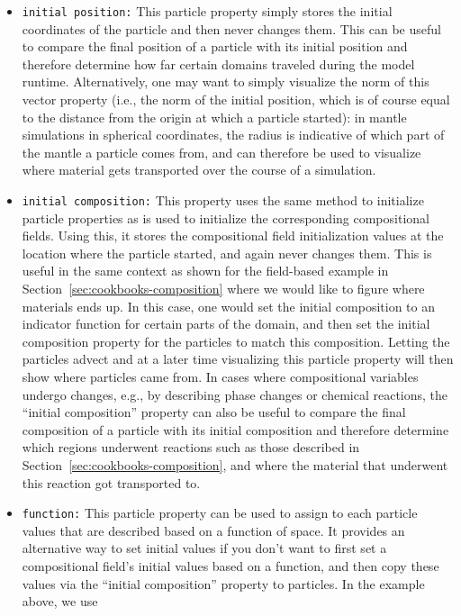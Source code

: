 \documentclass{article}
\begin{document}
\begin{itemize}
\item \texttt{initial position:} This particle property simply stores
  the initial coordinates of the particle and then never changes them. This
  can be useful to compare the final position of a particle with its 
  initial position and therefore determine how far certain domains traveled 
  during the model runtime. Alternatively, one may want to simply visualize
  the norm of this vector property (i.e., the norm of the initial position,
  which is of course equal to the distance from the origin at which a particle
  started): in mantle simulations in spherical coordinates, the radius is
  indicative of which part of the mantle a particle comes from, and can
  therefore be used to visualize where material gets transported over the course
  of a simulation.
\item \texttt{initial composition:} This property uses the same
  method to initialize particle properties as is used to initialize
  the corresponding compositional fields. Using this, it stores the
  compositional field initialization values at the location where the particle
  started, and again never changes them. This is useful in the same
  context as shown for the field-based example in
  Section~\ref{sec:cookbooks-composition} where we would like to
  figure where materials ends up. In this case, one would set the
  initial composition to an indicator function for certain parts of
  the domain, and then set the initial composition property for the
  particles to match this composition. Letting the particles advect
  and at a later time visualizing this particle property will then
  show where particles came from. In cases where compositional
  variables undergo changes, e.g., by describing phase changes or
  chemical reactions, the ``initial composition'' property can also be
  useful to compare the final composition of a particle with its
  initial composition and therefore determine which regions underwent
  reactions such as those described in Section~\ref{sec:cookbooks-composition},
  and where the material that underwent this reaction got transported
  to. 
\item \texttt{function:} This particle property can be used to assign
  to each particle values that are described based on a function of
  space. It provides an alternative way to set initial values if you
  don't want to first set a compositional field's initial values based
  on a function, and then copy these values via the ``initial
  composition'' property to particles. In the example above, we use

\end{itemize}
\end{document}
